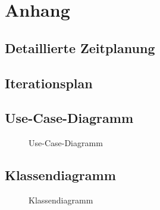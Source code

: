 \section{Anhang}
\subsection{Detaillierte Zeitplanung}
\label{app:Zeitplanung}



\clearpage


\clearpage

\subsection{Iterationsplan}
\label{app:Iterationsplan}


\clearpage

\subsection{Use-Case-Diagramm}
\label{app:UseCase}
\begin{figure}[htb]
\centering
{}
\caption{Use-Case-Diagramm}
\end{figure}


\clearpage


\clearpage


\clearpage


\clearpage


\clearpage 

\subsection{Klassendiagramm}
\label{app:Klassendiagramm}
\begin{figure}[htb]
\centering
{}
\caption{Klassendiagramm}
\end{figure}
\clearpage
